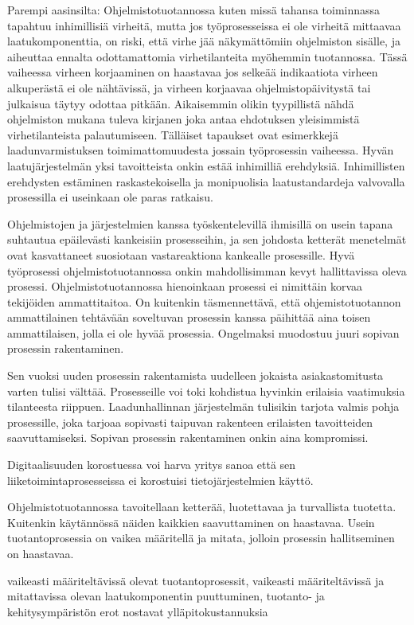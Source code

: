 \documentclass[finnish,12pt,a4paper,pdftex]{article}
\begin{document}
Parempi aasinsilta:
Ohjelmistotuotannossa kuten missä tahansa toiminnassa tapahtuu inhimillisiä virheitä, mutta jos työprosesseissa ei ole virheitä mittaavaa laatukomponenttia, on riski, että virhe jää näkymättömiin ohjelmiston sisälle, ja aiheuttaa ennalta odottamattomia virhetilanteita myöhemmin tuotannossa. Tässä vaiheessa virheen korjaaminen on haastavaa jos selkeää indikaatiota virheen alkuperästä ei ole nähtävissä, ja virheen korjaavaa ohjelmistopäivitystä tai julkaisua täytyy odottaa pitkään. Aikaisemmin olikin tyypillistä nähdä ohjelmiston mukana tuleva kirjanen joka antaa ehdotuksen yleisimmistä virhetilanteista palautumiseen. Tälläiset tapaukset ovat esimerkkejä laadunvarmistuksen toimimattomuudesta jossain työprosessin vaiheessa. Hyvän laatujärjestelmän yksi tavoitteista onkin estää inhimilliä erehdyksiä. Inhimillisten erehdysten estäminen raskastekoisella ja monipuolisia laatustandardeja valvovalla prosessilla ei useinkaan ole paras ratkaisu.

Ohjelmistojen ja järjestelmien kanssa työskentelevillä ihmisillä on usein tapana suhtautua epäilevästi kankeisiin prosesseihin, ja sen johdosta ketterät menetelmät ovat kasvattaneet suosiotaan vastareaktiona kankealle prosessille. Hyvä työprosessi ohjelmistotuotannossa onkin mahdollisimman kevyt hallittavissa oleva prosessi. Ohjelmistotuotannossa hienoinkaan prosessi ei nimittäin korvaa tekijöiden ammattitaitoa. On kuitenkin täsmennettävä, että ohjemistotuotannon ammattilainen tehtävään soveltuvan prosessin kanssa päihittää aina toisen ammattilaisen, jolla ei ole hyvää prosessia. Ongelmaksi muodostuu juuri sopivan prosessin rakentaminen.

Sen vuoksi uuden prosessin rakentamista uudelleen jokaista asiakastomitusta varten tulisi välttää. Prosesseille voi toki kohdistua hyvinkin erilaisia vaatimuksia tilanteesta riippuen. Laadunhallinnan järjestelmän tulisikin tarjota valmis pohja prosessille, joka tarjoaa sopivasti taipuvan rakenteen erilaisten tavoitteiden saavuttamiseksi. Sopivan prosessin rakentaminen onkin aina kompromissi. 

Digitaalisuuden korostuessa voi harva yritys sanoa että sen liiketoimintaprosesseissa ei korostuisi tietojärjestelmien käyttö. 


Ohjelmistotuotannossa tavoitellaan ketterää, luotettavaa ja turvallista tuotetta. Kuitenkin käytännössä näiden kaikkien saavuttaminen on haastavaa. Usein tuotantoprosessia on vaikea määritellä ja mitata, jolloin prosessin hallitseminen on haastavaa. 

vaikeasti määriteltävissä olevat tuotantoprosessit, vaikeasti määriteltävissä ja mitattavissa olevan laatukomponentin puuttuminen, tuotanto- ja kehitysympäristön erot nostavat ylläpitokustannuksia 
\end{document}
